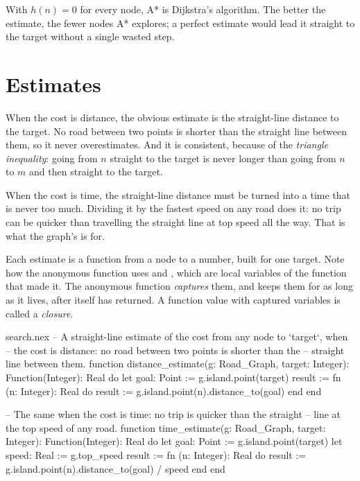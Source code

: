 With $h(n) = 0$ for every node, A* is Dijkstra's algorithm. The better the
estimate, the fewer nodes A* explores; a perfect estimate would lead it
straight to the target without a single wasted step.

\section{Estimates}

When the cost is distance, the obvious estimate is the straight-line
distance to the target. No road between two points is shorter than the
straight line between them, so it never overestimates. And it is
consistent, because of the \emph{triangle inequality}: going from $n$
straight to the target is never longer than going from $n$ to $m$ and then
straight to the target.

When the cost is time, the straight-line distance must be turned into a
time that is never too much. Dividing it by the fastest speed on any road
does it: no trip can be quicker than travelling the straight line at top
speed all the way. That is what the graph's  is for.

Each estimate is a function from a node to a number, built for one target.
Note how the anonymous function uses  and , which
are local variables of the function that made it. The anonymous function
\emph{captures} them, and keeps them for as long as it lives, after
 itself has returned. A function value with captured
variables is called a \emph{closure}.

\begin{append}{search.nex}
-- A straight-line estimate of the cost from any node to `target`, when
-- the cost is distance: no road between two points is shorter than the
-- straight line between them.
function distance_estimate(g: Road_Graph, target: Integer): Function(Integer): Real do
  let goal: Point := g.island.point(target)
  result := fn (n: Integer): Real do
    result := g.island.point(n).distance_to(goal)
  end
end

-- The same when the cost is time: no trip is quicker than the straight
-- line at the top speed of any road.
function time_estimate(g: Road_Graph, target: Integer): Function(Integer): Real do
  let goal: Point := g.island.point(target)
  let speed: Real := g.top_speed
  result := fn (n: Integer): Real do
    result := g.island.point(n).distance_to(goal) / speed
  end
end
\end{append}

